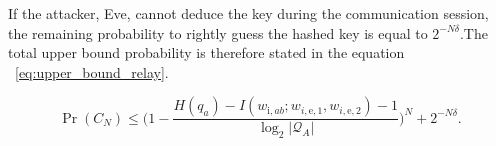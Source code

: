 If the attacker, Eve, cannot deduce the key during the communication session, the remaining probability to rightly guess the hashed key is equal to $2^{-N\delta}$.The total upper bound probability is therefore stated in the equation ~\ref{eq:upper_bound_relay}.

\begin{equation}
    \Pr(C_N)
    \le
    \bigl(
    1 -
    \frac{H(q_a) - I(w_{\mathrm{i},ab};w_{i,\mathrm{e},1},w_{i,\mathrm{e},2}) -1 }{\log_2 \lvert \mathcal{Q}_A \rvert}\bigr)^N + 2^{-N\delta}.
    \label{eq:upper_bound_relay}
\end{equation}



